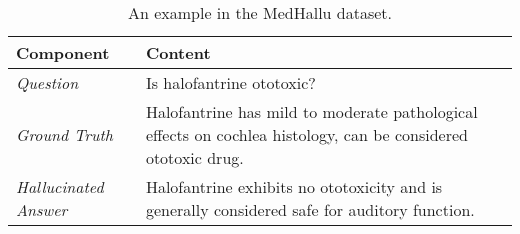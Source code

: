 \begin{table}[h]
    \centering
    \small
    \renewcommand{\arraystretch}{1.2}  %
    \begin{tabular}{|>{\raggedright\arraybackslash}p{}|>{\raggedright\arraybackslash}p{}|}
        \hline
        \rowcolor{gray!10} \textbf{Component} & \textbf{Content} \\
        \hline
        \textit{Question} & Is halofantrine ototoxic? \\
        \hline
        \textit{Ground Truth} & Halofantrine has mild to moderate pathological effects on cochlea histology, can be considered ototoxic drug. \\
        \hline
        \textit{Hallucinated Answer} & Halofantrine exhibits no ototoxicity and is generally considered safe for auditory function. \\
        \hline
    \end{tabular}
    \caption{An example in the MedHallu dataset.}
    \label{tab:dataset-example}
\end{table}